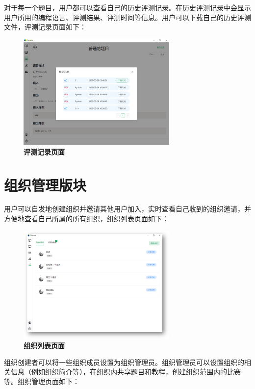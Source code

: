 对于每一个题目，用户都可以查看自己的历史评测记录。在历史评测记录中会显示用户所用的编程语言、评测结果、评测时间等信息。用户可以下载自己的历史评测文件，评测记录页面如下：

\begin{figure}[H]
    \centering
    \includegraphics[width=0.7\textwidth]{figure/problem2.png}
    \caption{\textbf{评测记录页面}}
    \label{fig:problem2}
\end{figure}

\section{组织管理版块}

用户可以自发地创建组织并邀请其他用户加入，实时查看自己收到的组织邀请，并方便地查看自己所属的所有组织，组织列表页面如下：

\begin{figure}[H]
    \centering
    \includegraphics[width=0.7\textwidth]{figure/team1.png}
    \caption{\textbf{组织列表页面}}
    \label{fig:team1}
\end{figure}

组织创建者可以将一些组织成员设置为组织管理员。组织管理员可以设置组织的相关信息（例如组织简介等），在组织内共享题目和教程，创建组织范围内的比赛等。组织管理页面如下：

